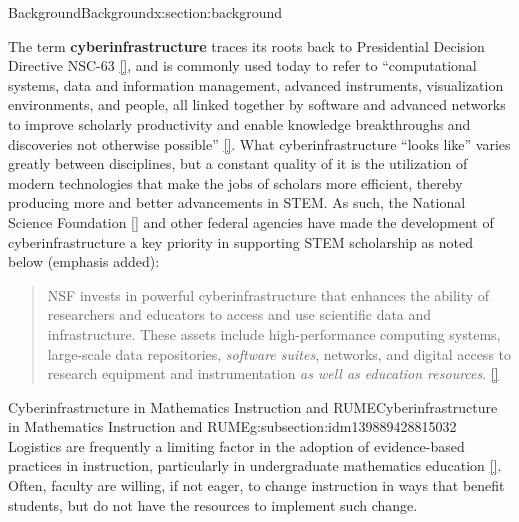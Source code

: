 \documentclass[oneside,10pt,]{article}
\newcommand{\xreffont}{\relax}
\newcommand{\terminology}[1]{\textbf{#1}}
\begin{document}
\begin{sectionptx}{Background}{}{Background}{}{}{x:section:background}
\begin{introduction}{}%
The term \terminology{cyberinfrastructure} traces its roots back to Presidential Decision Directive NSC-63 \hyperlink{x:biblio:biblio-prez}{[{\xreffont 27}]}, and is commonly used today to refer to ``computational systems, data and information management, advanced instruments, visualization environments, and people, all linked together by software and advanced networks to improve scholarly productivity and enable knowledge breakthroughs and discoveries not otherwise possible'' \hyperlink{x:biblio:biblio-cyber-educause}{[{\xreffont 14}]}. What cyberinfrastructure ``looks like'' varies greatly between disciplines, but a constant quality of it is the utilization of modern technologies that make the jobs of scholars more efficient, thereby producing more and better advancements in STEM. As such, the National Science Foundation \hyperlink{x:biblio:biblio-cyber-nsf}{[{\xreffont 19}]} and other federal agencies have made the development of cyberinfrastructure a key priority in supporting STEM scholarship as noted below (emphasis added):%
\begin{quote}%
NSF invests in powerful cyberinfrastructure that enhances the ability of researchers and educators to access and use scientific data and infrastructure. These assets include high-performance computing systems, large-scale data repositories, \emph{software suites}, networks, and digital access to research equipment and instrumentation \emph{as well as education resources}. \hyperlink{x:biblio:biblio-cyber-researchgov}{[{\xreffont 23}]}%
\end{quote}
\end{introduction}%
%
%
\typeout{************************************************}
\typeout{************************************************}
%
\begin{subsectionptx}{Cyberinfrastructure in Mathematics Instruction and RUME}{}{Cyberinfrastructure in Mathematics Instruction and RUME}{}{}{g:subsection:idm139889428815032}
Logistics are frequently a limiting factor in the adoption of evidence-based practices in instruction, particularly in undergraduate mathematics education \hyperlink{x:biblio:biblio-logistics}{[{\xreffont 24}]}. Often, faculty are willing, if not eager, to change instruction in ways that benefit students, but do not have the resources to implement such change.%

\end{subsectionptx}
\end{sectionptx}
\end{document}
